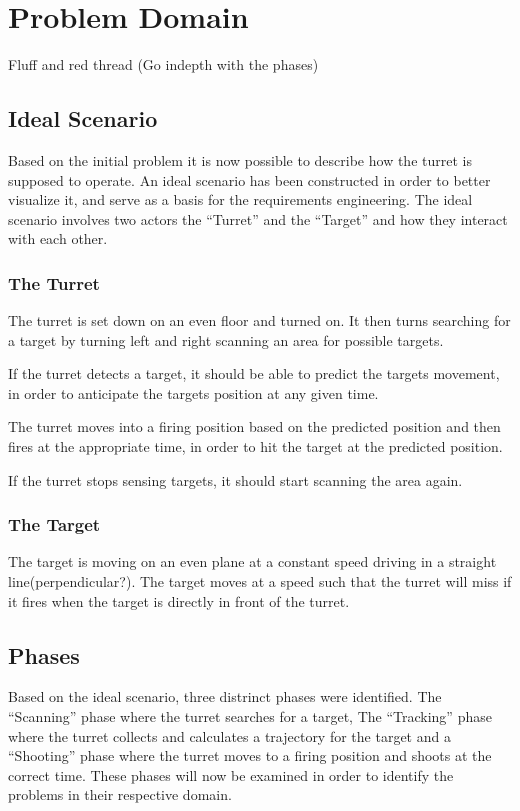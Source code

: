 \chapter{Problem Domain}
Fluff and red thread
(Go indepth with the phases)

\section{Ideal Scenario}
Based on the initial problem it is now possible to describe how the turret is
supposed to operate. An ideal scenario has been constructed in order to better
visualize it, and serve as a basis for the requirements engineering. The ideal
scenario involves two actors the ``Turret'' and the ``Target'' and how they
interact with each other.

\subsection{The Turret}

The turret is set down on an even floor and turned on. It then turns searching
for a target by turning left and right scanning an area for possible targets.

If the turret detects a target, it should be able to predict the targets
movement, in order to anticipate the targets position at any given time.

The turret moves into a firing position based on the predicted position and
then fires at the appropriate time, in order to hit the target at the predicted
position. 

If the turret stops sensing targets, it should start scanning the area again.

\subsection{The Target}
The target is moving on an even plane at a constant speed driving in a straight
line(perpendicular?). The target moves at a speed such that the turret will miss
if it fires when the target is directly in front of the turret.

\section{Phases}
Based on the ideal scenario, three distrinct phases were identified. The
``Scanning'' phase where the turret searches for a target, The ``Tracking''
phase where the turret collects and calculates a trajectory for the target and a
``Shooting'' phase where the turret moves to a firing position and shoots at the
correct time. These phases will now be examined in order to identify the
problems in their respective domain.

